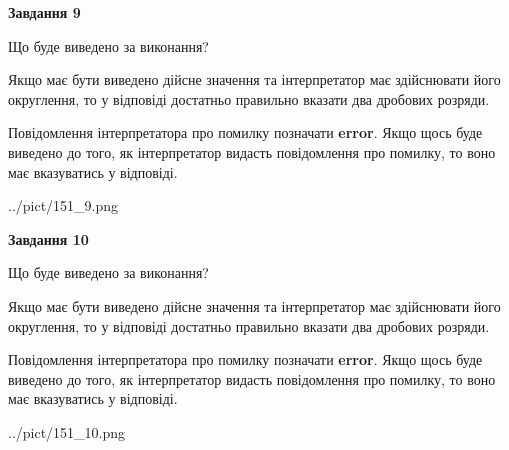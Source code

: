 \documentclass[12pt, ukrainian]{article}
\begin{document}
{\begin {Large}
{\begin {center}\textbf{Завдання 9}\end {center}}\par
Що буде виведено за виконання? \par

Якщо має бути виведено дійсне значення та інтерпретатор має здійснювати його округлення, 
то у відповіді достатньо правильно вказати два дробових розряди.

Повідомлення інтерпретатора про помилку позначати \textbf{error}.
Якщо щось буде виведено до того, як інтерпретатор видасть повідомлення про помилку, 
то воно має вказуватись у відповіді. \par

\begin{center}
	{../pict/151_9.png}
\end{center}
\newpage

{\begin {center}\textbf{Завдання 10}\end {center}}\par
Що буде виведено за виконання? \par

Якщо має бути виведено дійсне значення та інтерпретатор має здійснювати його округлення, 
то у відповіді достатньо правильно вказати два дробових розряди.

Повідомлення інтерпретатора про помилку позначати \textbf{error}.
Якщо щось буде виведено до того, як інтерпретатор видасть повідомлення про помилку, 
то воно має вказуватись у відповіді. \par

\begin{center}
	{../pict/151_10.png}
\end{center}
\newpage

\end {Large}}
\end{document}
